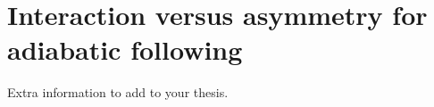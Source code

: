 
\chapter{Interaction versus asymmetry for adiabatic following}
\label{Interaction versus asymmetry for adiabatic following}

%

Extra information to add to your thesis.
